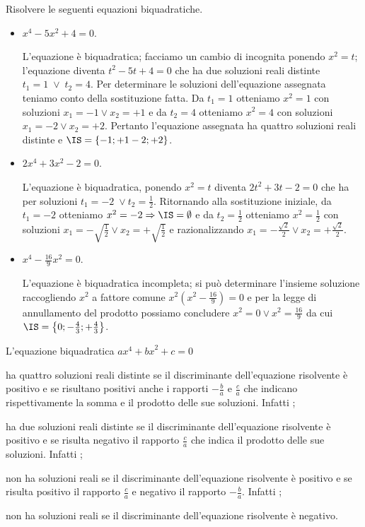 \begin{exrig}
\begin{esempio}
Risolvere le seguenti equazioni biquadratiche.
\begin{itemize}
\item $ x^4-5x^2+4=0 $.

L’equazione è biquadratica; facciamo un cambio di incognita ponendo $x^2=t$; l’equazione diventa $t^2-5t+4=0$ che ha due soluzioni reali distinte $t_1=1\;\vee \;t_2=4$. Per determinare le soluzioni dell’equazione assegnata teniamo conto della sostituzione fatta. Da $t_1=1$ otteniamo $x^2=1$ con soluzioni $x_1=-1\vee x_2=+1$ e da $t_2=4$ otteniamo $x^2=4$ con soluzioni $x_1=-2\vee x_2=+2$. Pertanto l’equazione assegnata ha quattro soluzioni reali distinte e $\IS=\{-1;+1-2;+2\}$.

\item $ 2x^4+3x^2-2=0 $.

L’equazione è biquadratica, ponendo $x^2=t$ diventa $2t^2+3t-2=0$ che ha per soluzioni $t_1=-2\;\vee t_2=\frac 1 2$. Ritornando alla sostituzione iniziale, da $t_1=-2$ otteniamo $x^2=-2\Rightarrow \IS=\emptyset $ e da $t_2=\frac 1 2$ otteniamo $x^2=\frac 1 2$ con soluzioni $x_1=-\sqrt{\frac 1 2}\vee x_2=+\sqrt{\frac 1 2}$ e razionalizzando $x_1=-\frac{\sqrt 2} 2\vee x_2=+\frac{\sqrt 2} 2$.

\item $ x^4-\frac{16} 9x^2=0 $.

L'equazione è biquadratica incompleta; si può determinare l’insieme soluzione raccogliendo $x^2$ a fattore comune $x^2\left(x^2-\frac{16} 9\right)=0$ e per la legge di annullamento del prodotto possiamo concludere $x^2=0\vee x^2=\frac{16} 9$ da cui $\IS=\left\{0;-\frac 4 3;+\frac 4 3\right\}$.
 \end{itemize}

\end{esempio}
\end{exrig}
\conclusione
L’equazione biquadratica ${ax}^4+{bx}^2+c=0$
\begin{itemize*}
\item ha quattro soluzioni reali distinte se il discriminante dell’equazione risolvente è positivo e se risultano positivi anche i rapporti $-\frac b a$ e $\frac c a$ che indicano rispettivamente la somma e il prodotto delle sue soluzioni. Infatti \dotfill;
\item ha due soluzioni reali distinte se il discriminante dell’equazione risolvente è positivo e se risulta negativo il rapporto $\frac c a$ che indica il prodotto delle sue soluzioni. Infatti \dotfill;
\item non ha soluzioni reali se il discriminante dell’equazione risolvente è positivo e se risulta positivo il rapporto $\frac c a$ e negativo il rapporto $-\frac b a$. Infatti \dotfill;
\item non ha soluzioni reali se il discriminante dell’equazione risolvente è negativo.
\end{itemize*}
